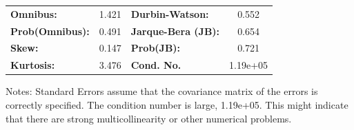\begin{center}
\begin{tabular}{lcccccc}
\bottomrule
\end{tabular}
\begin{tabular}{lclc}
\textbf{Omnibus:}       &  1.421 & \textbf{  Durbin-Watson:     } &    0.552  \\
\textbf{Prob(Omnibus):} &  0.491 & \textbf{  Jarque-Bera (JB):  } &    0.654  \\
\textbf{Skew:}          &  0.147 & \textbf{  Prob(JB):          } &    0.721  \\
\textbf{Kurtosis:}      &  3.476 & \textbf{  Cond. No.          } & 1.19e+05  \\
\bottomrule
\end{tabular}
\end{center}

Notes: \newline
 [1] Standard Errors assume that the covariance matrix of the errors is correctly specified. \newline
 [2] The condition number is large, 1.19e+05. This might indicate that there are \newline
 strong multicollinearity or other numerical problems.